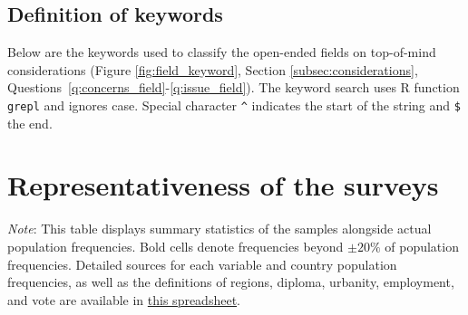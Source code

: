 \subsection{Definition of keywords}\label{subsec:keywords}

Below are the keywords used to classify the open-ended fields on top-of-mind considerations (Figure \ref{fig:field_keyword}, Section \ref{subsec:considerations}, Questions~\ref{q:concerns_field}-\ref{q:issue_field}). The keyword search uses R function \verb|grepl| and ignores case. Special character \verb|^| indicates the start of the string and \verb|$| the end.



% 

% 

\clearpage
\section{Representativeness of the surveys}\label{app:representativeness}

\begin{table}[h!]
    \caption[Sample representativeness in All, Eu, EU]{Sample representativeness overall, in Europe, and in the European Union. %
    } \label{tab:representativeness_0}
    \makebox[\textwidth][c]{
        \resizebox*{!}{.73\textheight}{%
        
        }
    }
    {\footnotesize \textit{Note}: This table displays summary statistics of the samples alongside actual population frequencies. Bold cells denote frequencies beyond $\pm 20\%$ of population frequencies. 
    Detailed sources for each variable and country population frequencies, as well as the definitions of regions, diploma, urbanity, employment, and vote are available in \href{https://github.com/bixiou/robustness_global_redistr/raw/main/questionnaire/sources.xlsx}{this spreadsheet}. 
    } 
\end{table}

